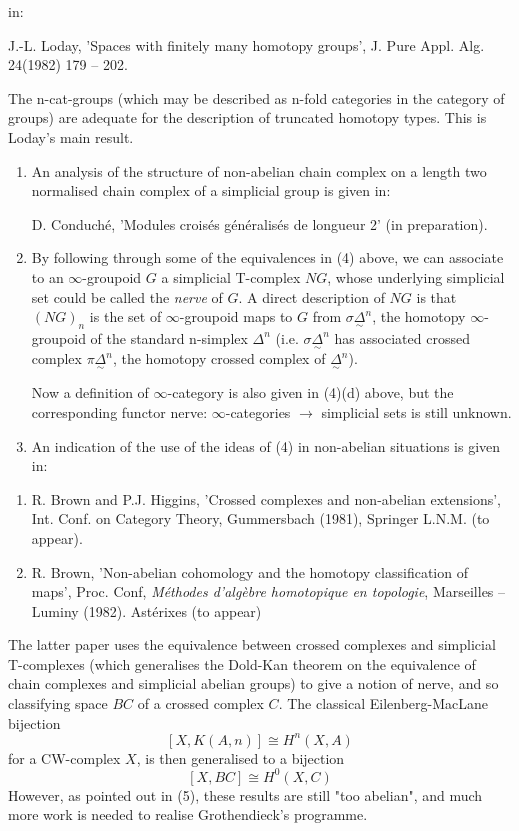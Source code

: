 \documentclass[11pt,a4paper]{article}
\begin{document}
in:

J.-L. Loday, 'Spaces with finitely many homotopy groups', J. Pure Appl. Alg. 24(1982) 179 -- 202.

The n-cat-groups (which may be described as n-fold categories in the category of groups) are adequate for the description of truncated homotopy types. This is Loday's main result.

\begin{enumerate}
  \item[7.] An analysis of the structure of non-abelian chain complex on a length two normalised chain complex of a simplicial group is given in:

  D. Conduché, 'Modules croisés généralisés de longueur 2' (in preparation).

  \item[8.] By following through some of the equivalences in (4) above, we can associate to an $\infty$-groupoid $G$ a simplicial T-complex $NG$, whose underlying simplicial set could be called the \emph{nerve} of $G$. A direct description of $NG$ is that $(NG)_n$ is the set of $\infty$-groupoid maps to $G$ from $\sigma\underset{\sim}{\Delta}^n$, the homotopy $\infty$-groupoid of the standard n-simplex $\Delta^n$ (i.e. $\sigma\underset{\sim}{\Delta}^n$ has associated crossed complex $\pi\underset{\sim}{\Delta}^n$, the homotopy crossed complex of $\underset{\sim}{\Delta}^n$).

  Now a definition of $\infty$-category is also given in (4)(d) above, but the corresponding functor nerve: $\infty$-categories $\longrightarrow$ simplicial sets is still unknown.

  \item[9.] An indication of the use of the ideas of (4) in non-abelian situations is given in:
\end{enumerate}

\begin{enumerate}
    \item[a)] R. Brown and P.J. Higgins, 'Crossed complexes and non-abelian extensions', Int. Conf. on Category Theory, Gummersbach (1981), Springer L.N.M. (to appear).
    \item[b)] R. Brown, 'Non-abelian cohomology and the homotopy classification of maps', Proc. Conf, \emph{Méthodes d'algèbre homotopique en topologie}, Marseilles -- Luminy (1982). Astérixes (to appear)
\end{enumerate}

The latter paper uses the equivalence between crossed complexes and simplicial T-complexes (which generalises the Dold-Kan theorem on the equivalence of chain complexes and simplicial abelian groups) to give a notion of nerve, and so classifying space $BC$ of a crossed complex $C$. The classical Eilenberg-MacLane bijection
\[
[X, K(A, n)] \cong H^n(X, A)
\]
for a CW-complex $X$, is then generalised to a bijection
\[
[X, BC] \cong H^0(X, C)
\]
However, as pointed out in (5), these results are still "too abelian", and much more work is needed to realise Grothendieck's programme.
\end{document}
